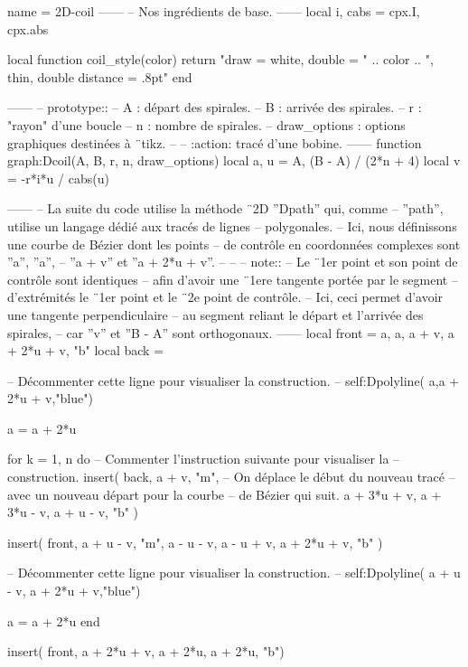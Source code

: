 \documentclass[varwidth]{standalone}
\begin{document}
\begin{luadraw}{name = 2D-coil}
------
-- Nos ingrédients de base.
------
local i, cabs = cpx.I, cpx.abs

local function coil_style(color)
  return "draw = white, double = " .. color
      .. ", thin, double distance = .8pt"
end

------
-- prototype::
--     A            : départ des spirales.
--     B            : arrivée des spirales.
--     r            : "rayon" d'une boucle
--     n            : nombre de spirales.
--     draw_options : options graphiques destinées à ¨tikz.
--
--     :action: tracé d'une bobine.
------
function graph:Dcoil(A, B, r, n, draw_options)
  local a, u = A, (B - A) / (2*n + 4)
  local v    = -r*i*u / cabs(u)

------
-- La suite du code utilise la méthode ¨2D ''Dpath'' qui, comme
-- ''path'', utilise un langage dédié aux tracés de lignes
-- polygonales.
-- Ici, nous définissons une courbe de Bézier dont les points
-- de contrôle en coordonnées complexes sont ''a'', ''a'',
-- ''a + v'' et ''a + 2*u + v''.
--
--
-- note::
--     Le ¨1er point et son point de contrôle sont identiques
--     afin d'avoir une ¨1ere tangente portée par le segment
--     d'extrémités le ¨1er point et le ¨2e point de contrôle.
--     Ici, ceci permet d'avoir une tangente perpendiculaire
--     au segment reliant le départ et l'arrivée des spirales,
--     car ''v'' et ''B - A'' sont orthogonaux.
------
  local front = {a, a, a + v, a + 2*u + v, "b"}
  local back  = {}

-- Décommenter cette ligne pour visualiser la construction.
--  self:Dpolyline( {a,a + 2*u + v},"blue")

  a = a + 2*u

  for k = 1, n do
-- Commenter l'instruction suivante pour visualiser la
-- construction.
    insert(
      back,
      {
        a + v, "m", -- On déplace le début du nouveau tracé
                    -- avec un nouveau départ pour la courbe
                    -- de Bézier qui suit.
        a + 3*u + v, a + 3*u - v, a + u - v, "b"
      })

    insert(
      front,
      {
        a + u - v, "m",
        a - u - v, a - u + v, a + 2*u + v, "b"
      })

-- Décommenter cette ligne pour visualiser la construction.
--    self:Dpolyline( {a + u - v, a + 2*u + v},"blue")

    a = a + 2*u
  end

  insert(
    front,
    {a + 2*u + v, a + 2*u, a + 2*u, "b"})


\end{luadraw}
\end{document}
